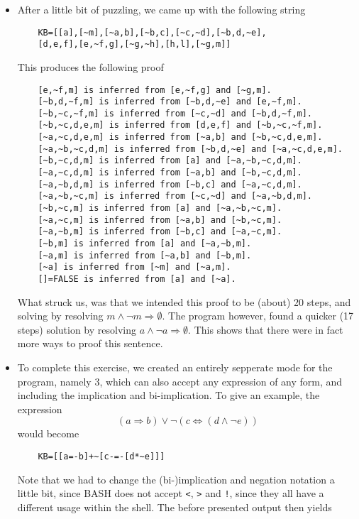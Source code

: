 \documentclass{report}
\begin{document}
\begin{itemize}
    \item After a little bit of puzzling, we came up with the following string\\
    \begin{verbatim}
    KB=[[a],[~m],[~a,b],[~b,c],[~c,~d],[~b,d,~e],
    [d,e,f],[e,~f,g],[~g,~h],[h,l],[~g,m]]
    \end{verbatim}
    This produces the following proof
    \begin{verbatim}
    [e,~f,m] is inferred from [e,~f,g] and [~g,m].
    [~b,d,~f,m] is inferred from [~b,d,~e] and [e,~f,m].
    [~b,~c,~f,m] is inferred from [~c,~d] and [~b,d,~f,m].
    [~b,~c,d,e,m] is inferred from [d,e,f] and [~b,~c,~f,m].
    [~a,~c,d,e,m] is inferred from [~a,b] and [~b,~c,d,e,m].
    [~a,~b,~c,d,m] is inferred from [~b,d,~e] and [~a,~c,d,e,m].
    [~b,~c,d,m] is inferred from [a] and [~a,~b,~c,d,m].
    [~a,~c,d,m] is inferred from [~a,b] and [~b,~c,d,m].
    [~a,~b,d,m] is inferred from [~b,c] and [~a,~c,d,m].
    [~a,~b,~c,m] is inferred from [~c,~d] and [~a,~b,d,m].
    [~b,~c,m] is inferred from [a] and [~a,~b,~c,m].
    [~a,~c,m] is inferred from [~a,b] and [~b,~c,m].
    [~a,~b,m] is inferred from [~b,c] and [~a,~c,m].
    [~b,m] is inferred from [a] and [~a,~b,m].
    [~a,m] is inferred from [~a,b] and [~b,m].
    [~a] is inferred from [~m] and [~a,m].
    []=FALSE is inferred from [a] and [~a].
    \end{verbatim}
    What struck us, was that we intended this proof to be (about) 20 steps, and solving by resolving $m \land \neg m \Rightarrow \emptyset$. The program however, found a quicker (17 steps) solution by resolving $a \land \neg a \Rightarrow \emptyset$. This shows that there were in fact more ways to proof this sentence.
    \item To complete this exercise, we created an entirely sepperate mode for the program, namely 3, which can also accept any expression of any form, and including the implication and bi-implication. To give an example, the expression 
    $$ (a \Rightarrow b) \lor \neg(c \Leftrightarrow (d \land \neg e)) $$
    would become 
    \begin{verbatim}
    KB=[[a=-b]+~[c-=-[d*~e]]]
    \end{verbatim}
    Note that we had to change the (bi-)implication and negation notation a little bit, since BASH does not accept \verb|<|, \verb|>| and \verb|!|, since they all have a different usage within the shell.
    The before presented output then yields
    \begin{verbatim}

\end{verbatim}
\end{itemize}
\end{document}

